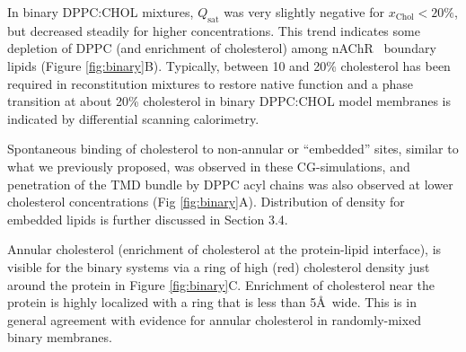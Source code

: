 \documentclass[final,3p,times,twocolumn]{elsarticle}
\newcommand{\qsat}{Q_{\mathrm{sat}}}
\newcommand{\xch}{x_{\mathrm{Chol}}}
\newcommand{\nachr}{nAChR}
\begin{document}
In binary DPPC:CHOL mixtures, $\qsat$ was very slightly negative for $\xch < 20\%$, but decreased steadily for higher concentrations. This trend indicates some depletion of DPPC (and enrichment of cholesterol) among \nachr~ boundary lipids (Figure \ref{fig:binary}B).  Typically, between 10 and 20\% cholesterol has been required in reconstitution mixtures to restore native function  \cite{Fong_Correlation_1986,Dalziel1980,Criado1982}  and a phase transition at about 20\% cholesterol in binary DPPC:CHOL model membranes is indicated by differential scanning calorimetry.\cite{Marsh2010} 

Spontaneous binding of cholesterol to non-annular or ``embedded'' sites, similar to what we previously proposed\cite{Brannigan_Embedded_2008}, was observed in these CG-simulations, and penetration of the TMD bundle by DPPC acyl chains was also observed at lower cholesterol concentrations (Fig \ref{fig:binary}A).  Distribution of density for embedded lipids is further discussed in Section 3.4.  

Annular cholesterol (enrichment of cholesterol at the protein-lipid interface), is visible for the binary systems via a ring of high (red) cholesterol density just around the protein in Figure \ref{fig:binary}C. Enrichment of cholesterol near the protein is highly localized with a ring that is less than 5\AA~wide. This is in general agreement with evidence for annular cholesterol in randomly-mixed binary membranes. \cite{Barrantes2010}
\end{document}
